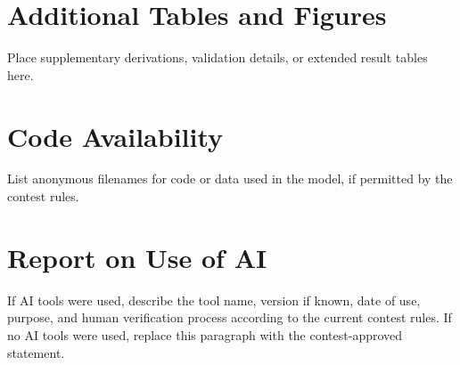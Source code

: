 \documentclass{mcmthesis}
\begin{document}
\appendix
\section{Additional Tables and Figures}
Place supplementary derivations, validation details, or extended result tables here.

\section{Code Availability}
List anonymous filenames for code or data used in the model, if permitted by the contest rules.

\section*{Report on Use of AI}
If AI tools were used, describe the tool name, version if known, date of use, purpose, and human verification process according to the current contest rules. If no AI tools were used, replace this paragraph with the contest-approved statement.
\end{document}
